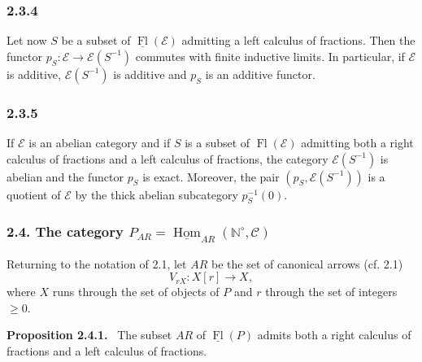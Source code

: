 \documentclass[11pt]{article}
\providecommand{\uHom}{\underline{\Hom}}
\providecommand{\NN}{\mathbb{N}}
\newenvironment{statement}[1]{\par\medskip\noindent\textbf{#1.}\ }{\par\medskip}
\DeclareMathOperator{\Hom}{Hom}
\providecommand{\Hom}{\operatorname{Hom}}
\providecommand{\Fl}{\operatorname{Fl}}
\providecommand{\NN}{\mathbb N}
\providecommand{\cC}{\mathcal C}
\providecommand{\cE}{\mathcal E}
\providecommand{\cC}{\mathcal C}
\providecommand{\Hom}{\operatorname{Hom}}
\begin{document}
\subsubsection*{2.3.4}
Let now $S$ be a subset of $\underline{\Fl}(\cE)$ admitting a left calculus of fractions. Then the functor $p_S:\cE\to\cE(S^{-1})$ commutes with finite inductive limits. In particular, if $\cE$ is additive, $\cE(S^{-1})$ is additive and $p_S$ is an additive functor.

\subsubsection*{2.3.5}
If $\cE$ is an abelian category and if $S$ is a subset of $\Fl(\cE)$ admitting both a right calculus of fractions and a left calculus of fractions, the category $\cE(S^{-1})$ is abelian and the functor $p_S$ is exact. Moreover, the pair $(p_S,\cE(S^{-1}))$ is a quotient of $\cE$ by the thick abelian subcategory $p_S^{-1}(0)$.

\subsubsection*{2.4. The category $P_{AR}=\uHom_{AR}(\NN^\circ,\cC)$}
Returning to the notation of 2.1, let $AR$ be the set of canonical arrows (cf. 2.1)
\[
V_{rX}:X[r]\longrightarrow X,
\]
where $X$ runs through the set of objects of $P$ and $r$ through the set of integers $\ge0$.

\begin{statement}{Proposition 2.4.1}
The subset $AR$ of $\underline{\Fl}(P)$ admits both a right calculus of fractions and a left calculus of fractions.
\end{statement}
\end{document}
